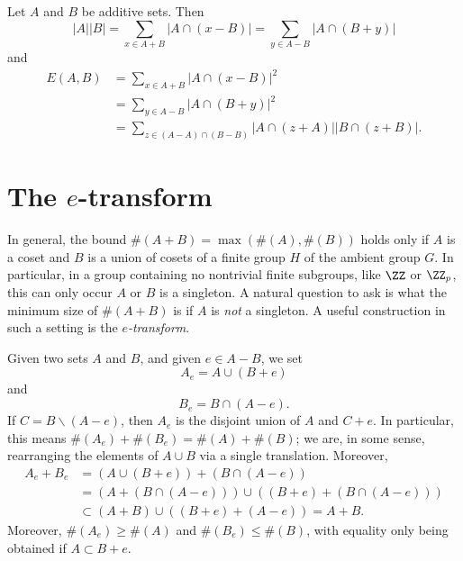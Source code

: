 \begin{lemma}
    Let $A$ and $B$ be additive sets. Then
    \[ |A||B| = \sum_{x \in A + B} |A \cap (x - B)| = \sum_{y \in A - B} |A \cap (B + y)| \]
    and
    \begin{align*}
        E(A,B) &= \sum_{x \in A + B} |A \cap (x - B)|^2\\
        &= \sum_{y \in A-B} |A \cap (B + y)|^2\\
        &= \sum_{z \in (A - A) \cap (B - B)} |A \cap (z + A)||B \cap (z + B)|.
    \end{align*}
\end{lemma}

\section{The $e$-transform}

In general, the bound $\#(A + B) = \max(\#(A),\#(B))$ holds only if $A$ is a coset and $B$ is a union of cosets of a finite group $H$ of the ambient group $G$. In particular, in a group containing no nontrivial finite subgroups, like $\ZZ$ or $\ZZ_p$, this can only occur $A$ or $B$ is a singleton. A natural question to ask is what the minimum size of $\#(A + B)$ is if $A$ is \emph{not} a singleton. A useful construction in such a setting is the \emph{$e$-transform}.

Given two sets $A$ and $B$, and given $e \in A - B$, we set
%
\[ A_e = A \cup (B + e) \]
%
and
%
\[ B_e = B \cap (A - e). \]
%
If $C = B \smallsetminus (A - e)$, then $A_e$ is the disjoint union of $A$ and $C + e$. In particular, this means $\#(A_e) + \#(B_e) = \#(A) + \#(B)$; we are, in some sense, rearranging the elements of $A \cup B$ via a single translation. Moreover,
%
\begin{align*}
    A_e + B_e &= (A \cup (B + e)) + (B \cap (A - e))\\
    &= (A + (B \cap (A - e))) \cup ((B + e) + (B \cap (A - e)))\\
    &\subset (A + B) \cup ((B + e) + (A - e)) = A + B.
\end{align*}
%
Moreover, $\#(A_e) \geq \#(A)$ and $\#(B_e) \leq \#(B)$, with equality only being obtained if $A \subset B + e$.

